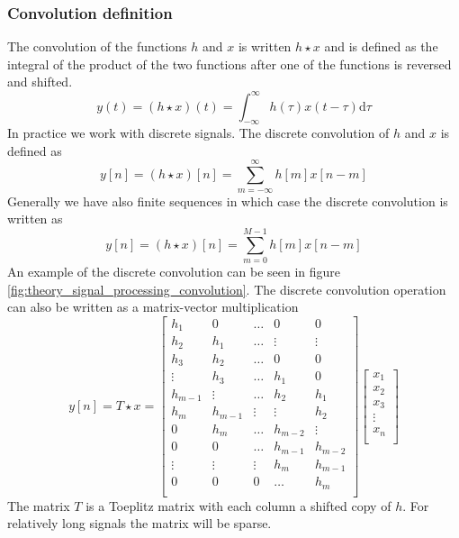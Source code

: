 \subsubsection{Convolution definition}
The convolution of the functions $h$ and $x$ is written $h \star x$ and is defined as the integral of the product of the two functions after one of the functions is reversed and shifted.
\begin{equation}
 y(t) = (h \star x)(t) = \int_{-\infty}^{\infty} h(\tau)x(t-\tau) \mathrm{d}\tau
\end{equation}
In practice we work with discrete signals. The discrete convolution of $h$ and $x$ is defined as
\begin{equation}
 y [n] = (h \star x )[n] = \sum_{m=-\infty}^{\infty} h[m] x[n-m]
\end{equation}
Generally we have also finite sequences in which case the discrete convolution is written as
\begin{equation}\label{eq:theory_signal_processing_convolution_fir}
 y [n] = (h \star x )[n] = \sum_{m=0}^{M-1} h[m] x[n-m]
\end{equation}
An example of the discrete convolution can be seen in figure \ref{fig:theory_signal_processing_convolution}.
The discrete convolution operation can also be written as a matrix-vector multiplication
\begin{equation}\label{eq:theory_signal_processing_convolution_toeplitz}
 y [n] = T \star x =
 \begin{bmatrix}
 h_1 & 0 & \hdots & 0 & 0 \\
 h_2 & h_1 & \hdots & \vdots & \vdots \\
 h_3 & h_2 & \hdots & 0 & 0 \\
 \vdots & h_3 & \hdots & h_1 & 0 \\
 h_{m-1} & \vdots & \hdots & h_2 & h_1 \\
 h_m & h_{m-1} & \vdots & \vdots & h_2 \\
 0 & h_m & \hdots & h_{m-2} & \vdots \\
 0 & 0 & \hdots & h_{m-1} & h_{m-2} \\
 \vdots & \vdots & \vdots & h_{m} & h_{m-1} \\
 0 & 0 & 0 & \hdots & h_{m} \\
 \end{bmatrix}
 \begin{bmatrix}
  x_1 \\
  x_2 \\
  x_3 \\
  \vdots \\
  x_n \\
 \end{bmatrix}
\end{equation}
The matrix $T$ is a Toeplitz matrix with each column a shifted copy of $h$.
For relatively long signals the matrix will be sparse.

